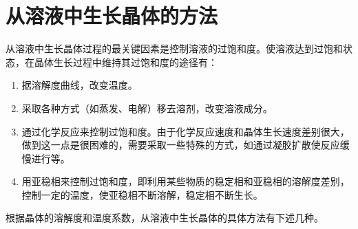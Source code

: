 \setcounter{section}{2}
\section{从溶液中生长晶体的方法}
从溶液中生长晶体过程的最关键因素是控制溶液的过饱和度。使溶液达到过饱和状态，在晶体生长过程中维持其过饱和度的途径有：
\begin{enumerate}[(1)]\itemsep -0.5ex
\item 据溶解度曲线，改变温度。
\item 采取各种方式（如蒸发、电解）移去溶剂，改变溶液成分。
\item 通过化学反应来控制过饱和度。由于化学反应速度和晶体生长速度差别很大，做到这一点是很困难的，需要采取一些特殊的方式，如通过凝胶扩散使反应缓慢进行等。
\item 用亚稳相来控制过饱和度，即利用某些物质的稳定相和亚稳相的溶解度差别，控制一定的温度，使亚稳相不断溶解，稳定相不断生长。
\end{enumerate}

根据晶体的溶解度和温度系数，从溶液中生长晶体的具体方法有下述几种。

